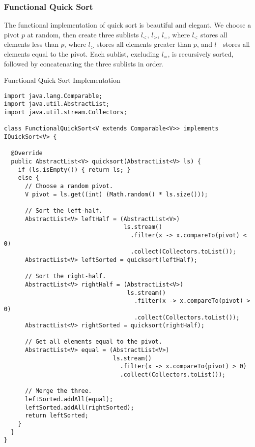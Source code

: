 \subsubsection*{Functional Quick Sort}
The functional implementation of quick sort is beautiful and elegant. We choose a pivot $p$ at random, then create three sublists $l_<$, $l_>$, $l_=$, where $l_<$ stores all elements less than $p$, where $l_>$ stores all elements greater than $p$, and $l_=$ stores all elements equal to the pivot. Each sublist, excluding $l_=$, is recursively sorted, followed by concatenating the three sublists in order. 

\begin{cl}[]{Functional Quick Sort Implementation}
\begin{lstlisting}[language=MyJava]
import java.lang.Comparable;
import java.util.AbstractList;
import java.util.stream.Collectors;

class FunctionalQuickSort<V extends Comparable<V>> implements IQuickSort<V> {

  @Override
  public AbstractList<V> quicksort(AbstractList<V> ls) {
    if (ls.isEmpty()) { return ls; }
    else {
      // Choose a random pivot.
      V pivot = ls.get((int) (Math.random() * ls.size()));

      // Sort the left-half.
      AbstractList<V> leftHalf = (AbstractList<V>) 
                                  ls.stream()
                                    .filter(x -> x.compareTo(pivot) < 0)
                                    .collect(Collectors.toList());
      AbstractList<V> leftSorted = quicksort(leftHalf);

      // Sort the right-half.
      AbstractList<V> rightHalf = (AbstractList<V>) 
                                   ls.stream()
                                     .filter(x -> x.compareTo(pivot) > 0)
                                     .collect(Collectors.toList());
      AbstractList<V> rightSorted = quicksort(rightHalf);

      // Get all elements equal to the pivot.
      AbstractList<V> equal = (AbstractList<V>) 
                               ls.stream()
                                 .filter(x -> x.compareTo(pivot) > 0)
                                 .collect(Collectors.toList());

      // Merge the three.
      leftSorted.addAll(equal);
      leftSorted.addAll(rightSorted);
      return leftSorted;
    }
  }
}
\end{lstlisting}
\end{cl}

